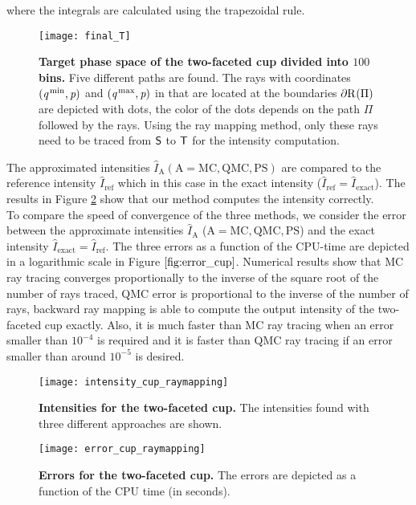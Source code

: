  where the integrals are calculated using the trapezoidal rule.
\begin{figure}[t]
  \begin{center}
  \texttt{[image: final\_T]}
  \end{center}
  \caption{\textbf{Target phase space of the two-faceted cup divided into $100$ bins.}
  Five different paths are found. The rays with coordinates $(\textit{q}^\textrm{\,min}, \textit{p})$ and $(\textit{q}^\textrm{\,max}, \textit{p})$ in  that are located at the boundaries $\partial \mbox{$\textup{R}_{\textit{}}$}(\Pi)$ are depicted with dots, the color of the dots depends on the path $\Pi$ followed by the rays.
  Using the ray mapping method, only these rays need to be traced from $\textsf{S}$ to $\textsf{T}$ for the intensity computation.}
  \label{fig:final_T}
\end{figure} 
The approximated intensities $\hat{I}_{\textrm{A}} (\textrm{A} = \textrm{MC}, \textrm{QMC},  \textrm{PS})$ are compared to the reference intensity $\hat{I}_\textrm{ref}$ which in this case in the exact intensity ($\hat{I}_{\textrm{ref}}=\hat{I}_{\textrm{exact}}$). The results in Figure \ref{fig:intensity_cup} show that our method computes the intensity correctly. 
 \\ \indent
To compare the speed of convergence of the three methods, we consider the error between the approximate intensities $\hat{I}_{\textrm{A}}$ ($\textrm{A} = \textrm{MC}, \textrm{QMC}, \textrm{PS}$) and the exact intensity $\hat{I}_{\mbox{exact}} = \hat{I}_{\mbox{ref}}$.
The three errors as a function of the CPU-time are depicted in a logarithmic scale in Figure $\ref{fig:error_cup}$. Numerical results show that MC ray tracing converges proportionally to the inverse of the square root of the number of rays traced, QMC error is proportional to the inverse of the number of rays, backward ray mapping is able to compute the output intensity of the two-faceted cup exactly. Also, it is much faster than MC ray tracing when an error smaller than $10^{-4}$ is required and it is faster than QMC ray tracing if an error smaller than around $10^{-5}$ is desired.
\begin{figure}[t]
  \begin{center}
  \texttt{[image: intensity\_cup\_raymapping]}
  \end{center}
  \caption{\textbf{Intensities for the two-faceted cup.} The intensities found with three different approaches are shown.}
  \label{fig:intensity_cup}
\end{figure}
\begin{figure}[h]
  \begin{center}
  \texttt{[image: error\_cup\_raymapping]}
  \end{center}
  \caption{\textbf{Errors for the two-faceted cup.} The errors are depicted as a function of the CPU time (in seconds).}
  \label{fig:error_cup}
\end{figure}
